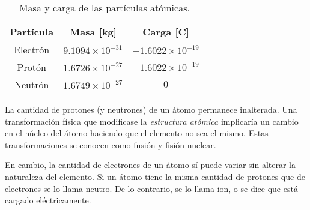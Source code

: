 \documentclass[a5paper,12pt,twoside]{book}
\begin{document}
\begin{table}[h!]
    \begin{center}
        \begin{tabular}{|c|c|c|}
            \hline
            Partícula & Masa [\si{\kilo\gram}] & Carga [\si{\coulomb}]
            \\ \hline \hline
            Electrón & $9.1094 \times 10^{-31}$ & $-1.6022 \times 10^{-19}$
            \\ \hline
            Protón & $1.6726 \times 10^{-27}$ & $+1.6022 \times 10^{-19}$
            \\ \hline
            Neutrón & $1.6749 \times 10^{-27}$ & $0$
            \\ \hline
        \end{tabular}
        \caption{Masa y carga de las partículas atómicas.}
    \end{center}
\end{table}

La cantidad de protones (y neutrones) de un átomo permanece inalterada. Una transformación física que modificase la \emph{estructura atómica} implicaría un cambio en el núcleo del átomo haciendo que el elemento no sea el mismo. Estas transformaciones se conocen como fusión y fisión nuclear.

En cambio, la cantidad de electrones de un átomo sí puede variar sin alterar la naturaleza del elemento. Si un átomo tiene la misma cantidad de protones que de electrones se lo llama neutro. De lo contrario, se lo llama ion, o se dice que está cargado eléctricamente.
\end{document}
